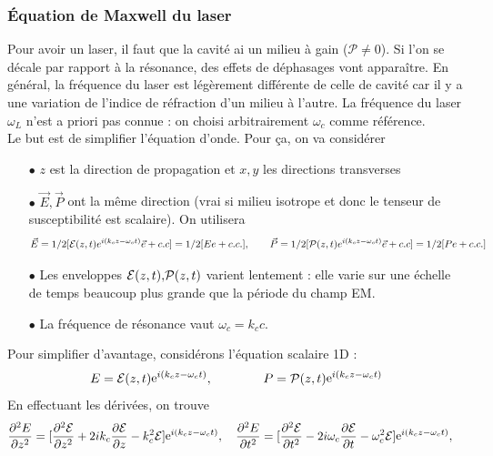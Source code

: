 \subsubsection{Équation de Maxwell du laser}
Pour avoir un laser, il faut que la cavité ai un milieu à gain ($\mathcal{P}\neq 0$). Si l'on se 
décale par rapport à la résonance, des effets de déphasages vont apparaître. En général, la fréquence 
du laser est légèrement différente de celle de cavité car il y a une variation de l'indice de 
réfraction d'un milieu à l'autre. La fréquence du laser $\omega_L$ n'est a priori pas connue : on 
choisi arbitrairement $\omega_c$ comme référence. \\

Le but est de simplifier l'équation d'onde. Pour ça, on va considérer
\begin{itemize}
\item[$\bullet$] $z$ est la direction de propagation et $x,y$ les directions transverses
\item[$\bullet$] $\vec{E},\vec{P}$ ont la même direction (vrai si milieu isotrope et donc le 
tenseur de susceptibilité est scalaire). On utilisera
\begin{equation}
\vec E = 1/2[{\cal E}(z,t){e^{i({k_c}z - {\omega _c}t)}}\vec e + c.c] = 1/2[Ee + c.c.],\qquad
\vec P = 1/2[{\cal P}(z,t){e^{i({k_c}z - {\omega _c}t)}}\vec e + c.c] = 1/2[Pe + c.c.]
\end{equation}
\item[$\bullet$] Les enveloppes ${\cal E}(z,t){\rm{, }}{\cal P}(z,t)$ varient lentement : elle 
varie sur une échelle de temps beaucoup plus grande que la période du champ EM. 
\item[$\bullet$] La fréquence de résonance vaut $\omega_c=k_cc$.
\end{itemize}
Pour simplifier d'avantage, considérons l'équation scalaire 1D : 
\begin{equation}
E = {\cal E}(z,t){{\mathop{\rm e}\nolimits} ^{i({k_c}z - {\omega _c}t)}},\qquad\qquad
P = {\cal P}(z,t){{\mathop{\rm e}\nolimits} ^{i({k_c}z - {\omega _c}t)}}
\end{equation}
En effectuant les dérivées, on trouve
\begin{equation}
\frac{{{\partial ^2}E}}{{\partial {z^2}}} = [\frac{{{\partial ^2}{\cal E}}}{{\partial {z^2}}} + 2i{k_c}\frac{{\partial {\cal E}}}{{\partial z}} - k_c^2{\cal E}]{{\mathop{\rm e}\nolimits} ^{i({k_c}z - {\omega _c}t)}},\quad \frac{{{\partial ^2}E}}{{\partial {t^2}}} = [\frac{{{\partial ^2}{\cal E}}}{{\partial {t^2}}} - 2i{\omega _c}\frac{{\partial {\cal E}}}{{\partial t}} - \omega _c^2{\cal E}]{{\mathop{\rm e}\nolimits} ^{i({k_c}z - {\omega _c}t)}},\quad 
\end{equation}
